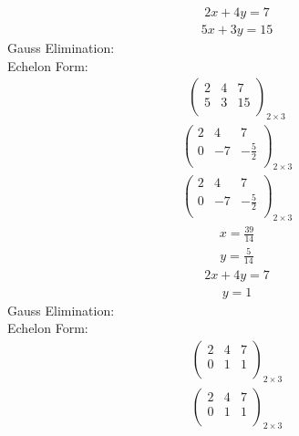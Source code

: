 \documentclass{article}
\begin{document}
\begin{align*}
2x + 4y=7\end{align*}
\begin{align*}
5x + 3y=15\end{align*}
Gauss Elimination:\\
Echelon Form:\\
\begin{align*}
\left(
\begin{array}{cc|c}
2 & 4 & 7\\
5 & 3 & 15\\
\end{array}
\right)_{2\times 3}
\end{align*}
\begin{align*}
\left(
\begin{array}{cc|c}
2 & 4 & 7\\
0 & -7 & -\frac{5}{2}\\
\end{array}
\right)_{2\times 3}
\end{align*}
\begin{align*}
\left(
\begin{array}{cc|c}
2 & 4 & 7\\
0 & -7 & -\frac{5}{2}\\
\end{array}
\right)_{2\times 3}
\end{align*}
\begin{align*}
x=\frac{39}{14}\end{align*}
\begin{align*}
y=\frac{5}{14}\end{align*}
\begin{align*}
2x + 4y=7\end{align*}
\begin{align*}
y=1\end{align*}
Gauss Elimination:\\
Echelon Form:\\
\begin{align*}
\left(
\begin{array}{cc|c}
2 & 4 & 7\\
0 & 1 & 1\\
\end{array}
\right)_{2\times 3}
\end{align*}
\begin{align*}
\left(
\begin{array}{cc|c}
2 & 4 & 7\\
0 & 1 & 1\\
\end{array}
\right)_{2\times 3}
\end{align*}
\end{document}

